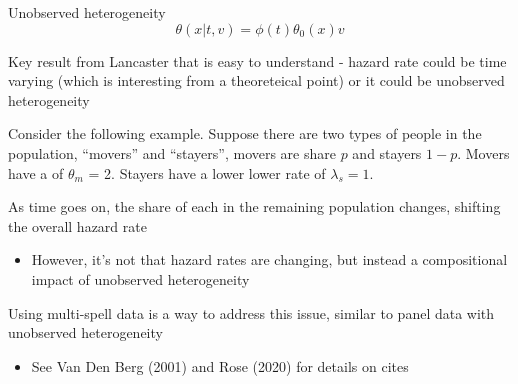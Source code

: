 \documentclass[notes,11pt, aspectratio=169]{beamer}
\newenvironment{wideitemize}{\itemize\addtolength{\itemsep}{10pt}}{\enditemize}
\begin{document}
\begin{frame}{Unobserved heterogeneity}
  \begin{equation}
    \theta(x|t, v) = \phi(t) \theta_{0}(x) v
  \end{equation}
  
  \begin{wideitemize}
  \item   Key result from Lancaster that is easy to understand - hazard rate could be time varying (which is interesting from a theoreteical point) or it could be unobserved heterogeneity
  \item Consider the following example. Suppose there are two
    types of people in the population, ``movers'' and ``stayers'',
    movers are share $p$ and stayers $1-p$. Movers have a of
    $\theta_{m}$ = 2. Stayers have a lower lower rate of
    $\lambda_{s} = 1$.
  \item As time goes on, the share of each in the remaining
    population changes, shifting the overall hazard rate
    \begin{itemize}
    \item However, it's not that hazard rates are changing, but
      instead a compositional impact of unobserved heterogeneity
    \end{itemize}
  \item Using multi-spell data is a way to address this issue,
    similar to panel data with unobserved heterogeneity
    \begin{itemize}
    \item See Van Den Berg (2001) and Rose (2020) for details on cites
    \end{itemize}
  \end{wideitemize}
\end{frame}
\end{document}
